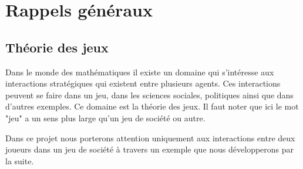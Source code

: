 \documentclass[a4paper, 12pt, french]{article}
\begin{document}
	\section{Rappels généraux}
	\subsection{Théorie des jeux}
	Dans le monde des mathématiques il existe un domaine qui s'intéresse aux interactions stratégiques qui existent
	entre plusieurs agents. Ces interactions peuvent se faire dans un jeu, dans les sciences sociales, politiques
	ainsi que dans d'autres exemples. Ce domaine est la théorie des jeux\cite{wiki_theorie_jeux}.
	Il faut noter que ici le mot "jeu" a un sens plus large qu'un jeu de société ou autre.

	Dans ce projet nous porterons attention uniquement aux interactions entre deux joueurs dans un jeu de société à
	travers un exemple que nous développerons par la suite.
\end{document}
